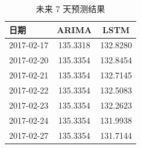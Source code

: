 \begin{table}[htbp]
\centering
\caption{未来 7 天预测结果}
\begin{tabular}{lcc}
\toprule
日期 & ARIMA & LSTM \\
\midrule
2017-02-17 & 135.3318 & 132.8280 \\
2017-02-20 & 135.3354 & 132.8454 \\
2017-02-21 & 135.3354 & 132.7145 \\
2017-02-22 & 135.3354 & 132.5083 \\
2017-02-23 & 135.3354 & 132.2623 \\
2017-02-24 & 135.3354 & 131.9938 \\
2017-02-27 & 135.3354 & 131.7144 \\
\bottomrule
\end{tabular}
\end{table}
